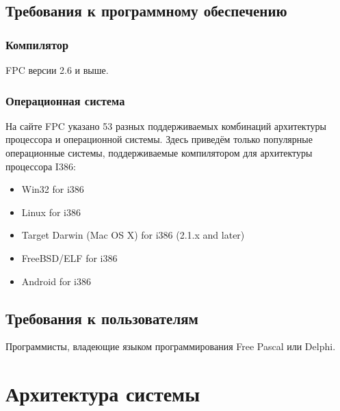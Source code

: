 \documentclass{imcs}
\begin{document}
\subsection{Требования к программному обеспечению}

\subsubsection{Компилятор} 
FPC версии 2.6 и выше.

\subsubsection{Операционная система}
На сайте FPC указано 53 разных поддерживаемых комбинаций архитектуры 
процессора и операционной системы\cite{fpctargets}. Здесь приведём
только популярные операционные системы, поддерживаемые компилятором
для архитектуры процессора I386:
\begin{itemize}
    \item Win32 for i386
    \item Linux for i386
    \item Target Darwin (Mac OS X) for i386 (2.1.x and later)
    \item FreeBSD/ELF for i386
    \item Android for i386
\end{itemize}
    
\subsection{Требования к пользователям}
Программисты, владеющие языком программирования Free Pascal или Delphi.

\section{Архитектура системы}
\end{document}
